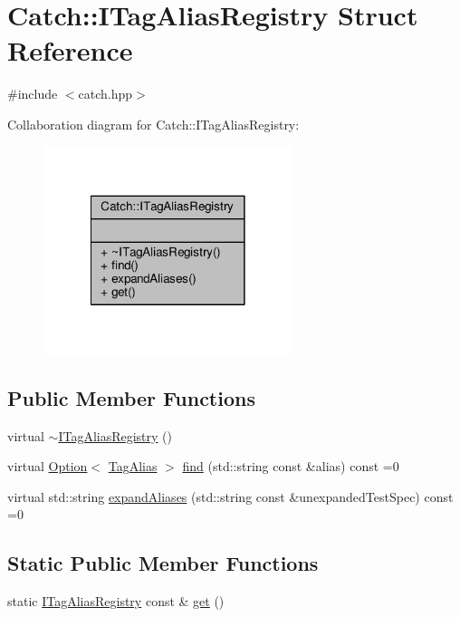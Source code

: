 \hypertarget{struct_catch_1_1_i_tag_alias_registry}{\section{Catch\-:\-:I\-Tag\-Alias\-Registry Struct Reference}
\label{struct_catch_1_1_i_tag_alias_registry}
}


{\ttfamily \#include $<$catch.\-hpp$>$}



Collaboration diagram for Catch\-:\-:I\-Tag\-Alias\-Registry\-:
\nopagebreak
\begin{figure}[H]
\begin{center}
\leavevmode
\includegraphics[width=206pt]{struct_catch_1_1_i_tag_alias_registry__coll__graph}
\end{center}
\end{figure}
\subsection*{Public Member Functions}
\begin{DoxyCompactItemize}
\item 
virtual \hyperlink{struct_catch_1_1_i_tag_alias_registry_a8967db4dd40b68e22697eff0f4928239}{$\sim$\-I\-Tag\-Alias\-Registry} ()
\item 
virtual \hyperlink{class_catch_1_1_option}{Option}$<$ \hyperlink{struct_catch_1_1_tag_alias}{Tag\-Alias} $>$ \hyperlink{struct_catch_1_1_i_tag_alias_registry_a7d2fba4d39cfcc62c2695fcde4f989c3}{find} (std\-::string const \&alias) const =0
\item 
virtual std\-::string \hyperlink{struct_catch_1_1_i_tag_alias_registry_ae729a7532faf7466db1a157ce0395170}{expand\-Aliases} (std\-::string const \&unexpanded\-Test\-Spec) const =0
\end{DoxyCompactItemize}
\subsection*{Static Public Member Functions}
\begin{DoxyCompactItemize}
\item 
static \hyperlink{struct_catch_1_1_i_tag_alias_registry}{I\-Tag\-Alias\-Registry} const \& \hyperlink{struct_catch_1_1_i_tag_alias_registry_aa9d0f008f49473389c7abf6071f137a7}{get} ()
\end{DoxyCompactItemize}


